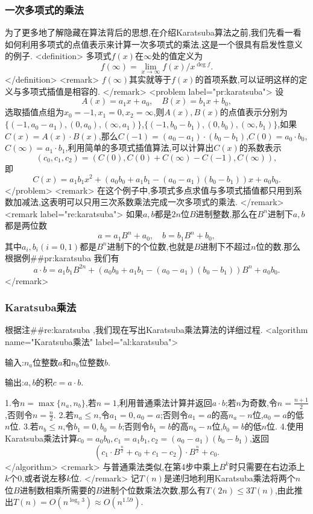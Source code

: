 \documentclass{ctexart}
\begin{document}
\subsubsection{一次多项式的乘法}

为了更多地了解隐藏在算法背后的思想,在介绍Karatsuba算法之前,我们先看一看如何利用多项式的点值表示来计算一次多项式的乘法,这是一个很具有启发性意义的例子.
<definition>
多项式$f(x)$在$\infty$处的值定义为$$f(\infty)=\lim_{x\rightarrow\infty}f(x)/x^{\deg{f}}.$$
</definition>
<remark>
$f(\infty)$其实就等于$f(x)$的首项系数,可以证明这样的定义与多项式插值是相容的.
</remark>
<problem label="pr:karatsuba">
设$$A(x)=a_1x+a_0,\quad B(x)=b_1x+b_0,$$选取插值点组为$x_0=-1,x_1=0,x_2=\infty$,则$A(x),B(x)$的点值表示分别为$\{(-1,a_0-a_1),(0,a_0),(\infty,a_1)\}$,$\{(-1,b_0-b_1),(0,b_0),(\infty,b_1)\}$,如果$C(x)=A(x)\cdot B(x)$,那么$C(-1)=(a_0-a_1)\cdot(b_0-b_1)$,$C(0)=a_0\cdot b_0$,$C(\infty)=a_1\cdot b_1$,利用简单的多项式插值算法,可以计算出$C(x)$的系数表示$$(c_0,c_1,c_2)=(C(0),C(0)+C(\infty)-C(-1),C(\infty)),$$即$$C(x)=a_1b_1x^2+(a_0b_0+a_1b_1-(a_0-a_1)(b_0-b_1))x+a_0b_0.$$
</problem>
<remark>
在这个例子中,多项式多点求值与多项式插值都只用到系数加减法,这表明可以只用三次系数乘法完成一次多项式的乘法.
</remark>
<remark label="re:karatsuba">
如果$a,b$都是$2n$位$B$进制整数,那么在$B^n$进制下$a,b$都是两位数$$a=a_1B^n+a_0,\quad b=b_1B^n+b_0,$$其中$a_i,b_i(i=0,1)$都是$B^n$进制下的个位数,也就是$B$进制下不超过$n$位的数.那么根据例##pr:karatsuba 我们有$$a\cdot b=a_1 b_1B^{2n}+(a_0b_0+a_1b_1-(a_0-a_1)(b_0-b_1))B^n+a_0b_0.$$
</remark>

\subsubsection{Karatsuba乘法}

根据注##re:karatsuba ,我们现在写出Karatsuba乘法算法的详细过程.
<algorithm  name="Karatsuba乘法" label="al:karatsuba">

输入:$n_a$位整数$a$和$n_b$位整数$b$.

输出:$a,b$的积$c=a\cdot b$.

 1.令$n=\max\{n_a,n_b\}$,若$n=1$,利用普通乘法计算并返回$a\cdot b$;若$n$为奇数,令$n=\frac{n+1}{2}$,否则令$n=\frac{n}{2}$.
 2.若$n_a\le n$,令$a_1=0,a_0=a$;否则令$a_1=a$的高$n_a-n$位,$a_0=a$的低$n$位.
 3.若$n_b\le n$,令$b_1=0,b_0=b$;否则令$b_1=b$的高$n_b-n$位,$b_0=b$的低$n$位. 
 4.使用Karatsuba乘法计算$c_0=a_0b_0,c_1=a_1b_1,c_2=(a_0-a_1)(b_0-b_1)$,返回$$(c_1\cdot B^{\frac{n}{2}}+c_0+c_1-c_2)\cdot B^{\frac{n}{2}}+c_0.$$
</algorithm>
<remark>
与普通乘法类似,在第4步中乘上$B^k$时只需要在右边添上$k$个0,或者说左移$k$位.
</remark>
记$T(n)$是递归地利用Karatsuba乘法将两个$n$位$B$进制数相乘所需要的$B$进制个位数乘法次数,那么有$T(2n)\le 3T(n)$,由此推出$T(n)=O(n^{\log_2{3}})\approx O(n^{1.59})$.
\end{document}
